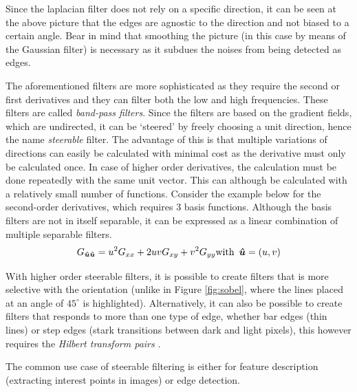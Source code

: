 \documentclass[twoside,a4paper,article]{combine}
\begin{document}
Since the laplacian filter does not rely on a specific direction, it can be seen at the above picture that the edges are agnostic to the direction and not biased to a certain angle. Bear in mind that smoothing the picture (in this case by means of the Gaussian filter)
is necessary as it subdues the noises from being detected as edges.

The aforementioned filters are more sophisticated as they require the second or first derivatives and they can filter both the low and high frequencies. 
These filters are called \emph{band-pass filters}.
Since the filters are based on the gradient fields, which are undirected, it can be `steered' by freely choosing a unit direction, hence the name
\emph{steerable} filter. The advantage of this is that multiple variations of directions can easily be calculated with minimal cost as the derivative must only be calculated once. In case of higher order derivatives,
the calculation must be done repeatedly with the same unit vector. This can although be calculated with a relatively small number of functions\cite{Szeliski_2022}. Consider the example below for the second-order derivatives,
which requires 3 basis functions. Although the basis filters are not in itself separable, it can be expressed as a linear combination of multiple separable filters.
\[
    G_{\boldsymbol{\hat{u}}\boldsymbol{\hat{u}}} = u^2 G_{xx} + 2uvG_{xy} + v^2 G_{yy} \text{with} \hspace*{0.5em}\boldsymbol{\hat{u}} = (u, v)
\]

With higher order steerable filters, it is possible to create filters that is more selective with the orientation (unlike in Figure \ref{fig:sobel}, where the lines placed at an angle of $45^\circ$ is highlighted). Alternatively,
it can also be possible to create filters that responds to more than one type of edge, whether bar edges (thin lines) or step edges (stark transitions between dark and light pixels), this however requires the \emph{Hilbert transform pairs}
\cite{Szeliski_2022}.

The common use case of steerable filtering is either for feature description (extracting interest points in images) or edge detection\cite{Szeliski_2022}.
\end{document}
